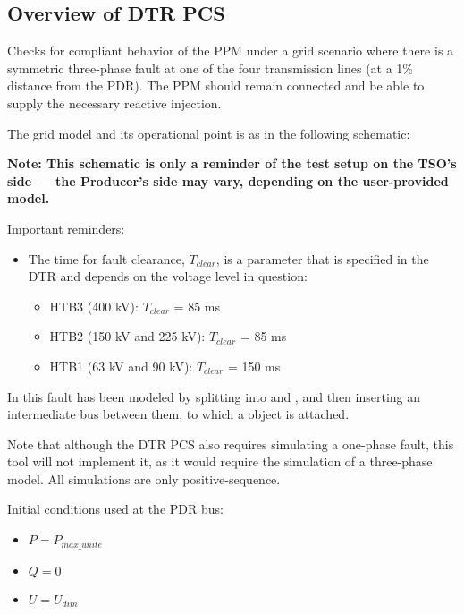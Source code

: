     \subsection{Overview of DTR PCS \DTRPcs}

    Checks for compliant behavior of the PPM under a grid scenario where there
    is a symmetric three-phase fault at one of the four transmission lines
    (at a 1\% distance from the PDR). The PPM should remain connected and
    be able to supply the necessary reactive injection.

    The grid model and its operational point is as in the following schematic:
    \begin{center}
        
    \end{center}
    \begin{center}
        \small \textbf{Note: This schematic is only a reminder of the test setup on the TSO's
        side --- the Producer's side may vary, depending on the user-provided model.}
    \end{center}

    \noindent Important reminders:
    \begin{itemize}
        \item The time for fault clearance, $T_{clear}$, is a parameter that
        is specified in the DTR and depends on the voltage level in
        question:
        \begin{itemize}
            \item HTB3 (400 kV): $T_{clear}$ = 85 ms
            \item HTB2 (150 kV and 225 kV): $T_{clear}$ = 85 ms
            \item HTB1 (63 kV and 90 kV): $T_{clear}$ = 150 ms
        \end{itemize}
    \end{itemize}

    In \Dynawo{} this fault has been modeled by splitting  into
     and , and then inserting an intermediate bus between
    them, to which a  object is attached.

    Note that although the DTR PCS also requires simulating a one-phase
    fault, this tool will not implement it, as it would require the
    simulation of a three-phase model. All simulations are only
    positive-sequence.

    \begin{description}
        \item Initial conditions used at the PDR bus:
        \begin{itemize}
            \item $P = P_{max\_unite}$
            \item $Q = 0$
            \item $U = U_{dim}$
        \end{itemize}
    \end{description}


